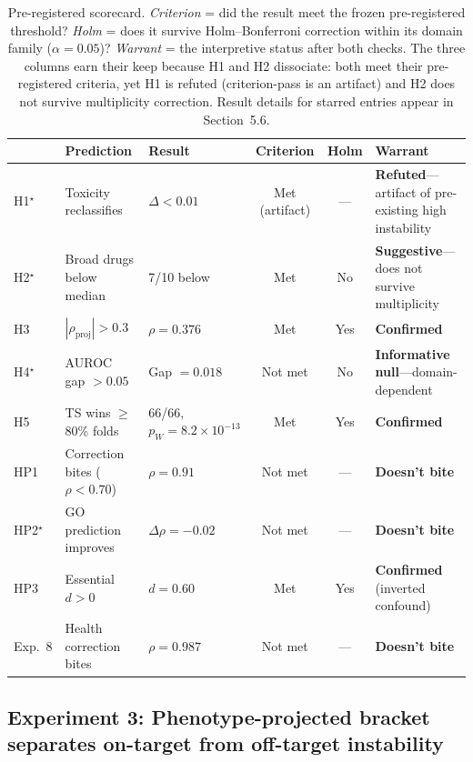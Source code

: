 \documentclass[11pt]{article}
\begin{document}
\begin{table}[t]
\centering
\caption{Pre-registered scorecard.
\emph{Criterion} = did the result meet the frozen pre-registered
threshold?
\emph{Holm} = does it survive Holm--Bonferroni correction within its
domain family ($\alpha = 0.05$)?
\emph{Warrant} = the interpretive status after both checks.
The three columns earn their keep because H1 and H2 dissociate:
both meet their pre-registered criteria, yet H1 is refuted
(criterion-pass is an artifact) and H2 does not survive multiplicity
correction.
Result details for starred entries appear in Section~5.6.}
\label{tab:scorecard}
\small
\begin{tabular}{lllccp{3.6cm}}
\toprule
 & Prediction & Result & Criterion & Holm & Warrant \\
\midrule
H1$^\star$ & Toxicity reclassifies & $\Delta < 0.01$ & Met (artifact) & --- & \textbf{Refuted}---artifact of pre-existing high instability \\
H2$^\star$ & Broad drugs below median & 7/10 below & Met & No & \textbf{Suggestive}---does not survive multiplicity \\
H3 & $|\rho_{\text{proj}}| > 0.3$ & $\rho = 0.376$ & Met & Yes & \textbf{Confirmed} \\
H4$^\star$ & AUROC gap $> 0.05$ & Gap $= 0.018$ & Not met & No & \textbf{Informative null}---domain-dependent \\
H5 & TS wins $\geq$80\% folds & 66/66, $p_W\!=\!8.2\!\times\!10^{-13}$ & Met & Yes & \textbf{Confirmed} \\
\midrule
HP1 & Correction bites ($\rho < 0.70$) & $\rho = 0.91$ & Not met & --- & \textbf{Doesn't bite} \\
HP2$^\star$ & GO prediction improves & $\Delta\rho = -0.02$ & Not met & --- & \textbf{Doesn't bite} \\
HP3 & Essential $d > 0$ & $d = 0.60$ & Met & Yes & \textbf{Confirmed} (inverted confound) \\
\midrule
Exp.~8 & Health correction bites & $\rho = 0.987$ & Not met & --- & \textbf{Doesn't bite} \\
\bottomrule
\end{tabular}
\end{table}

\subsection{Experiment 3: Phenotype-projected bracket separates on-target from off-target instability}
\end{document}
